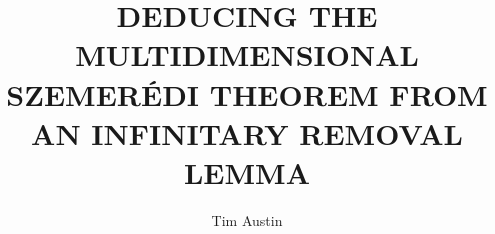 \documentclass[12pt]{article}
\begin{document}
\title{\Large{\textbf{DEDUCING THE MULTIDIMENSIONAL SZEMER\'EDI THEOREM FROM AN INFINITARY REMOVAL LEMMA}}}
\author{Tim Austin}
\date{}

\maketitle


\newenvironment{nmath}{\begin{center}\begin{math}}{\end{math}\end{center}}

\newtheorem{thm}{THEOREM}[section]
\newtheorem*{thm*}{THEOREM}
\newtheorem{lem}[thm]{LEMMA}
\newtheorem{prop}[thm]{PROPOSITION}
\newtheorem{cor}[thm]{COROLLARY}
\newtheorem*{conj*}{CONJECTURE}
\newtheorem{dfn}[thm]{DEFINITION}
\newtheorem{ques}[thm]{QUESTION}
\theoremstyle{remark}


\newcommand{\A}{\mathcal{A}}
\newcommand{\B}{\mathcal{B}}
\newcommand{\I}{\mathcal{I}}
\newcommand{\frH}{\mathfrak{H}}
\renewcommand{\Pr}{\mathrm{Pr}}
\newcommand{\s}{\sigma}
\renewcommand{\P}{\mathcal{P}}
\renewcommand{\O}{\Omega}
\renewcommand{\S}{\Sigma}
\newcommand{\T}{\mathrm{T}}
\newcommand{\co}{\mathrm{co}}
\newcommand{\e}{\mathrm{e}}
\newcommand{\eps}{\varepsilon}
\renewcommand{\d}{\mathrm{d}}
\newcommand{\im}{\mathrm{i}}
\renewcommand{\l}{\lambda}
\newcommand{\U}{\mathcal{U}}
\newcommand{\G}{\Gamma}
\newcommand{\g}{\gamma}
\newcommand{\calL}{\mathcal{L}}
\renewcommand{\L}{\Lambda}
\newcommand{\hcf}{\mathrm{hcf}}
\newcommand{\FLat}{\mathrm{FLat}}
\newcommand{\F}{\mathcal{F}}
\renewcommand{\a}{\alpha}
\newcommand{\bbN}{\mathbb{N}}
\newcommand{\bbR}{\mathbb{R}}
\newcommand{\bbZ}{\mathbb{Z}}
\newcommand{\bbQ}{\mathbb{Q}}
\newcommand{\bbT}{\mathbb{T}}
\newcommand{\sfE}{\mathsf{E}}
\newcommand{\sfP}{\mathsf{P}}
\newcommand{\id}{\mathrm{id}}
\newcommand{\bb}[1]{\mathbb{#1}}
\newcommand{\fr}[1]{\mathfrak{#1}}
\renewcommand{\bf}[1]{\mathbf{#1}}
\renewcommand{\rm}[1]{\mathrm{#1}}
\renewcommand{\cal}[1]{\mathcal{#1}}
\newcommand{\fin}{\nolinebreak\hspace{\stretch{1}}$\lhd$}
\newcommand{\uhr}{\!\!\upharpoonright}
\end{document}
